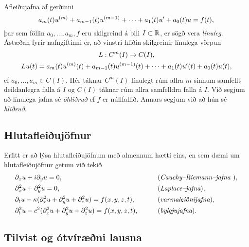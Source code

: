 Afleiðujafna af gerðinni 
 \begin{equation*}a_m(t)u\sp{(m)}+a_{m-1}(t)u\sp{(m-1)}+\cdots+a_1(t)u'+a_0(t)u=f(t),
\label{1.1.5}
 \end{equation*}
þar sem föllin $a_0,\dots,a_m,f$ eru skilgreind á bili $I\subset {\mathbb R}$,
er sögð vera {\it línuleg}.  Ástæðan
fyrir nafngiftinni er, að vinstri hliðin skilgreinir línulega vörpun
\begin{gather*}
L:C\sp m(I)\to C(I),\\
Lu(t)=
a_m(t)u\sp{(m)}(t)+a_{m-1}(t)u\sp{(m-1)}(t)+
\cdots+a_1(t)u'(t)+a_0(t)u(t),
\end{gather*}
ef $a_0,\dots,a_m\in C(I)$.
Hér táknar $C^m(I)$ línulegt rúm allra $m$ sinnum samfellt deildanlegra
falla á $I$ og $C(I)$ táknar rúm allra samfelldra falla á $I$.  
Við segjum að línulega jafna  sé {\it
óhliðruð} ef $f$ er núllfallið.
Annars segjum við að hún sé {\it
hliðruð}.  

\subsection*{Hlutafleiðujöfnur}

Erfitt er að lýsa hlutafleiðujöfnum 
með almennum hætti eins, en sem dæmi um hlutafleiðujöfnur
getum við tekið
\begin{alignat*}{2}
&\partial_xu+i\partial_yu=0,& \qquad
&\text{({\it
Cauchy--Riemann--jafna\index{Cauchy--Riemann!jafna}
\index{jafna!Cauchy--Riemann}})},\\
&\partial_x\sp 2u+\partial_y\sp 2u=0,&\qquad
&\text{({\it Laplace--jafna\index{Laplace!jafna}\index{jafna!Laplace}})},\\
&\partial_tu-\kappa(\partial_x\sp 2u+\partial_y\sp 2u+\partial_z\sp
2u)=f(x,y,z,t),& \qquad
&\text{({\it varmaleiðnijafna\index{varmaleiðnijafna}})},\\
&\partial_t^2u-c^2(\partial_x\sp 2u+\partial_y\sp 2u+\partial_z\sp
2u)=f(x,y,z,t),& \qquad
&\text{({\it bylgjujafna\index{bylgjujafna}})}.
\end{alignat*}

\subsection*{Tilvist og ótvíræðni lausna}

